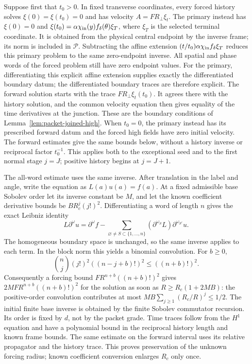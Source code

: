 \documentclass[11pt]{article}
\theoremstyle{definition}
\begin{document}
Suppose first that $t_0>0$. In fixed transverse coordinates, every
forced history solves
$\xi(0)=\xi(t_0)=0$ and has velocity $A=FR_\perp\xi_t$.
The primary instead has $\xi(0)=0$ and
$\xi(t_0)=\alpha\chi_{\rm in}(y)f_\delta(\theta)\xi_T$, where $\xi_T$ is the
selected terminal coordinate. It is obtained from the physical
central endpoint by the inverse frame; its norm is included in $\mathcal P$.
Subtracting the affine extension
$(t/t_0)\alpha\chi_{\rm in}f_\delta\xi_T$ reduces this primary problem to the
same zero-endpoint inverse. All spatial and phase words of the forced
problem still have zero endpoint values. For the primary, differentiating
this explicit affine extension supplies exactly the differentiated
boundary datum; the differentiated boundary traces are therefore explicit.
The forward solution starts with the trace $FR_\perp\xi_t(t_0)$.
It agrees there with the history solution, and the common velocity equation
then gives equality of the time derivatives at the junction. These are
the boundary conditions of Lemma~\ref{lem:packet-joined-high}.
When $t_0=0$, the primary instead has its prescribed forward datum
and the forced high fields have zero initial velocity. The forward
estimates give the same bounds below, without a history inverse or
reciprocal factor $t_0^{-1}$. This applies both to the exceptional seed
and to the first normal stage $j=J$; positive history begins at $j=J+1$.

The all-word estimate uses the same inverse. After
translation in the label and angle, write the equation as
$L(a)u(a)=f(a)$. At a fixed admissible base Sobolev order let its inverse constant
be $M$, and let the known coefficient derivative bounds be
$B R_c^j(j!)^2$. Differentiating a word of length $n$ gives the exact
Leibniz identity
\[
 L\partial^\omega u=\partial^\omega f-
 \sum_{\varnothing\ne S\subset\{1,\ldots,n\}}
 (\partial^{\omega_S}L)\partial^{\omega_{S^c}}u.
\]
The homogeneous boundary space is unchanged, so the same inverse applies
to each term. In the block norm this yields a binomial convolution.
For $b\ge0$,
\[
 \binom nj(j!)^2((n-j+b)!)^2\le((n+b)!)^2.
\]
Consequently a forcing bound $F R^{n+b}((n+b)!)^2$ gives
$2MF R^{n+b}((n+b)!)^2$ for the solution as soon as
$R\ge R_c(1+2MB)$: the positive-order convolution contributes at most
$MB\sum_{j\ge1}(R_c/R)^j\le1/2$.
The initial finite base inverse is obtained by the finite Sobolev
commutator recursion. Its order is fixed by $d$, not by the packet grade.
Time traces follow from the $H^1$ equation and have a polynomial bound
in the reciprocal history length and known frame bounds. The same estimate
on the forward interval uses its relative propagator and the
history trace. This proves preservation of the unknown forcing radius;
known coefficient conversion enlarges $R_c$ only once.
\end{document}
